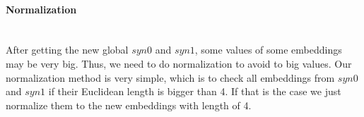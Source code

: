 \paragraph{Normalization}\ \\
After getting the new global $syn0$ and $syn1$, some values of some embeddings may be very big. Thus, we need to do normalization to avoid to big values. Our normalization method is very simple, which is to check all embeddings from $syn0$ and $syn1$ if their Euclidean length is bigger than 4. If that is the case we just normalize them to the new embeddings with length of 4.

